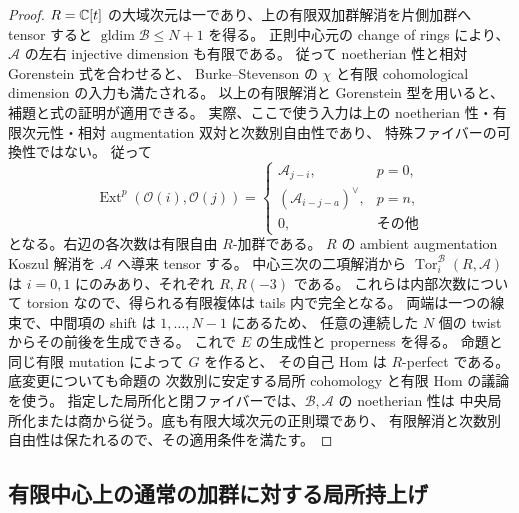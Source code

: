 \begin{proof}
$R=\mathbb C[t]$ の大域次元は一であり、上の有限双加群解消を片側加群へ tensor すると
$\operatorname{gldim}\mathscr B\leq N+1$ を得る。
正則中心元の change of rings により、$\mathscr A$ の左右 injective dimension も有限である。
従って noetherian 性と相対 Gorenstein 式を合わせると、
Burke--Stevenson の $\chi$ と有限 cohomological dimension の入力も満たされる。
以上の有限解消と Gorenstein 型を用いると、
補題と式の証明が適用できる。
実際、ここで使う入力は上の noetherian 性・有限次元性・相対 augmentation 双対と次数別自由性であり、
特殊ファイバーの可換性ではない。
従って
\[
 \operatorname{Ext}^p(\mathcal O(i),\mathcal O(j))=
 \begin{cases}
  \mathscr A_{j-i},&p=0,\\
  (\mathscr A_{i-j-a})^\vee,&p=n,\\
  0,&\text{その他}
 \end{cases}
\]
となる。右辺の各次数は有限自由 $R$-加群である。
$R$ の ambient augmentation Koszul 解消を $\mathscr A$ へ導来 tensor する。
中心三次の二項解消から $\operatorname{Tor}^{\mathscr B}_i(R,\mathscr A)$ は
$i=0,1$ にのみあり、それぞれ $R,R(-3)$ である。
これらは内部次数について torsion なので、得られる有限複体は tails 内で完全となる。
両端は一つの線束で、中間項の shift は $1,\ldots,N-1$ にあるため、
任意の連続した $N$ 個の twist からその前後を生成できる。
これで $E$ の生成性と properness を得る。
命題と同じ有限 mutation によって $G$ を作ると、
その自己 Hom は $R$-perfect である。
底変更についても命題の
次数別に安定する局所 cohomology と有限 Hom の議論を使う。
指定した局所化と閉ファイバーでは、$\mathscr B,\mathscr A$ の noetherian 性は
中央局所化または商から従う。底も有限大域次元の正則環であり、
有限解消と次数別自由性は保たれるので、その適用条件を満たす。
\end{proof}

\subsection{有限中心上の通常の加群に対する局所持上げ}


